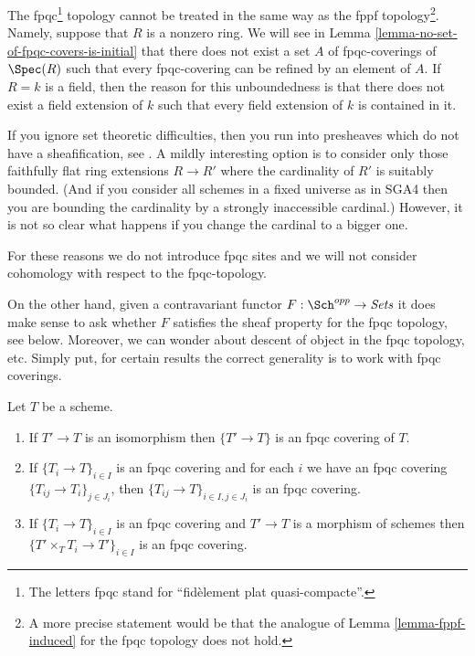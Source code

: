 \noindent
The fpqc\footnote{The letters fpqc stand for
``fid\`element plat quasi-compacte''.}
topology cannot be treated in the same way as the fppf
topology\footnote{A more precise statement would be that the analogue of
Lemma \ref{lemma-fppf-induced} for the fpqc topology does not hold.}.
Namely, suppose that $R$ is a nonzero ring. We will see in
Lemma \ref{lemma-no-set-of-fpqc-covers-is-initial}
that there does not exist a set $A$ of fpqc-coverings of $\Spec(R)$
such that every fpqc-covering can be refined by an element of $A$.
If $R = k$ is a field, then the reason for this unboundedness is that
there does not exist a field extension of $k$ such that every field extension
of $k$ is contained in it.

\medskip\noindent
If you ignore set theoretic difficulties, then you run into presheaves
which do not have a sheafification, see
\cite[Theorem 5.5]{Waterhouse-fpqc-sheafification}.
A mildly interesting option is to consider only those faithfully flat ring
extensions $R \to R'$ where the cardinality of $R'$ is suitably bounded.
(And if you consider all schemes in a fixed universe as in SGA4 then you
are bounding the cardinality by a strongly inaccessible cardinal.)
However, it is not so clear what happens if you change the cardinal
to a bigger one.

\medskip\noindent
For these reasons we do not introduce fpqc sites and we will not consider
cohomology with respect to the fpqc-topology.

\medskip\noindent
On the other hand, given a contravariant functor
$F : \Sch^{opp} \to \textit{Sets}$
it does make sense to ask whether $F$ satisfies the sheaf property
for the fpqc topology, see below.
Moreover, we can wonder about descent of object
in the fpqc topology, etc. Simply put, for certain results the correct
generality is to work with fpqc coverings.

\begin{lemma}
\label{lemma-fpqc}
Let $T$ be a scheme.
\begin{enumerate}
\item If $T' \to T$ is an isomorphism then $\{T' \to T\}$
is an fpqc covering of $T$.
\item If $\{T_i \to T\}_{i\in I}$ is an fpqc covering and for each
$i$ we have an fpqc covering $\{T_{ij} \to T_i\}_{j\in J_i}$, then
$\{T_{ij} \to T\}_{i \in I, j\in J_i}$ is an fpqc covering.
\item If $\{T_i \to T\}_{i\in I}$ is an fpqc covering
and $T' \to T$ is a morphism of schemes then
$\{T' \times_T T_i \to T'\}_{i\in I}$ is an fpqc covering.
\end{enumerate}
\end{lemma}

